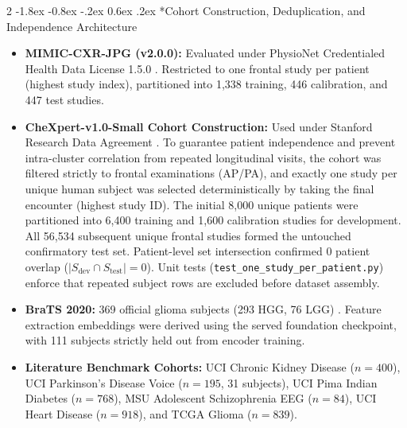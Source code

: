 \documentclass[10pt,a4paper,twoside]{article}
\makeatletter
\renewcommand{\subsection}{\@startsection{subsection}{2}{\z@}%
  {-1.8ex \@plus -0.8ex \@minus -.2ex}%
  {0.6ex \@plus.2ex}%
  {\normalfont\normalsize\sffamily\bfseries\color{naturedark}}}
\makeatother
\begin{document}
\begin{multicols}{2}
\subsection*{Cohort Construction, Deduplication, and Independence Architecture}
\begin{itemize}
  \setlength{\itemsep}{1pt}
  \item \textbf{MIMIC-CXR-JPG (v2.0.0):} Evaluated under PhysioNet Credentialed Health Data License 1.5.0 \cite{johnson2019}. Restricted to one frontal study per patient (highest study index), partitioned into 1,338 training, 446 calibration, and 447 test studies.
  \item \textbf{CheXpert-v1.0-Small Cohort Construction:} Used under Stanford Research Data Agreement \cite{irvin2019}. To guarantee patient independence and prevent intra-cluster correlation from repeated longitudinal visits, the cohort was filtered strictly to frontal examinations (AP/PA), and exactly one study per unique human subject was selected deterministically by taking the final encounter (highest study ID). The initial 8,000 unique patients were partitioned into 6,400 training and 1,600 calibration studies for development. All 56,534 subsequent unique frontal studies formed the untouched confirmatory test set. Patient-level set intersection confirmed 0 patient overlap ($|S_{\text{dev}} \cap S_{\text{test}}| = 0$). Unit tests (\texttt{test\_one\_study\_per\_patient.py}) enforce that repeated subject rows are excluded before dataset assembly.
  \item \textbf{BraTS 2020:} 369 official glioma subjects (293 HGG, 76 LGG) \cite{bakas2017}. Feature extraction embeddings were derived using the served foundation checkpoint, with 111 subjects strictly held out from encoder training.
  \item \textbf{Literature Benchmark Cohorts:} UCI Chronic Kidney Disease ($n=400$), UCI Parkinson's Disease Voice ($n=195$, 31 subjects), UCI Pima Indian Diabetes ($n=768$), MSU Adolescent Schizophrenia EEG ($n=84$), UCI Heart Disease ($n=918$), and TCGA Glioma ($n=839$).
\end{itemize}


\end{multicols}
\end{document}
